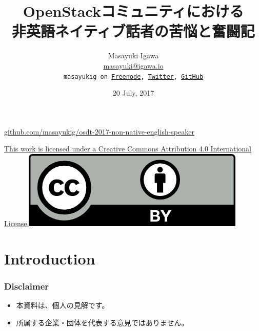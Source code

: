 \documentclass[aspectratio=169,11pt,hyperref={colorlinks=true}]{beamer}
\author[Masayuki Igawa]{%
  \texorpdfstring{%
    \centering
    Masayuki Igawa\\
    \href{mailto:masayuki@igawa.io}{masayuki@igawa.io}\\
    \texttt{masayukig on \href{http://freenode.net/}{Freenode},
     \href{https://twitter.com/masayukig}{Twitter},
     \href{https://github.com/masayukig}{GitHub}}
  }
  {Masayuki Igawa}
}
\date{20 July, 2017}
\title[Non-Native-English-Speaker
\hspace{2em}\insertframenumber/\inserttotalframenumber]{OpenStackコミュニティにおける\\非英語ネイティブ話者の苦悩と奮闘記}
\begin{document}
{%
\begin{frame}[noframenumbering]
  \hypersetup{colorlinks,urlcolor=suse}
  \titlepage{}
  \centering
  \@place \par
  \href{https://github.com/masayukig/osdt-2017-non-native-english-speaker}{github.com/masayukig/osdt-2017-non-native-english-speaker}\\
  \vspace{1em}
  \begin{flushright}
    \tiny\href{https://creativecommons.org/licenses/by/4.0/}{This work
      is licensed under a Creative Commons Attribution 4.0
      International License.}\includegraphics[scale=0.3]{cc_by.png}
  \end{flushright}
\end{frame}
}


\section{Introduction}
\begin{frame}
  \frametitle{Disclaimer}
  \begin{itemize}
    \item 本資料は、個人の見解です。
    \item 所属する企業・団体を代表する意見ではありません。
  \end{itemize}
\end{frame}
\end{document}
